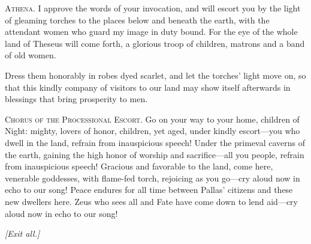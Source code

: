 \documentclass[12pt]{article}
\begin{document}
\textsc{Athena.} I approve the words of your invocation, and will escort you by the light of gleaming torches to the places below and beneath the earth, with the attendant women who guard my image in duty bound. For the eye of the whole land of Theseus will come forth, a glorious troop of children, matrons and a band of old women.

Dress them honorably in robes dyed scarlet, and let the torches' light move on, so that this kindly company of visitors to our land may show itself afterwards in blessings that bring prosperity to men.

\textsc{Chorus of the Processional Escort.} Go on your way to your home, children of Night: mighty, lovers of honor, children, yet aged, under kindly escort---you who dwell in the land, refrain from inauspicious speech! Under the primeval caverns of the earth, gaining the high honor of worship and sacrifice---all you people, refrain from inauspicious speech! Gracious and favorable to the land, come here, venerable goddesses, with flame-fed torch, rejoicing as you go---cry aloud now in echo to our song! Peace endures for all time between Pallas' citizens and these new dwellers here. Zeus who sees all and Fate have come down to lend aid---cry aloud now in echo to our song!

\begin{center}
\textit{[Exit all.]}
\end{center}
\end{document}
